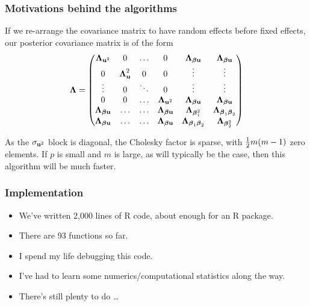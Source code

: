 \documentclass{beamer}
\begin{document}
\begin{frame}
\frametitle{Motivations behind the algorithms}
If we re-arrange the covariance matrix to have random effects before
fixed effects, our posterior covariance matrix is of the form
\begin{align*} {\boldsymbol\Lambda} =
\begin{pmatrix}
{\boldsymbol\Lambda}_{{\bf u}^2} & 0 & \ldots & 0 & {\boldsymbol \Lambda}_{{\boldsymbol \beta} {\bf u}} & {\boldsymbol \Lambda}_{{\boldsymbol \beta} {\bf u}} \\
0 & {\boldsymbol \Lambda}_{{\bf u}}^2 & 0 & 0 & \vdots & \vdots \\
\vdots & 0 & \ddots & 0 & \vdots & \vdots \\
0 & 0 & \ldots & {\boldsymbol \Lambda}_{{\bf u}^2} & {\boldsymbol \Lambda}_{{\boldsymbol \beta} {\bf u}} & {\boldsymbol \Lambda}_{{\boldsymbol \beta} {\bf u}} \\
{\boldsymbol \Lambda}_{{\boldsymbol \beta} {\bf u}} & \ldots & \ldots & {\boldsymbol \Lambda}_{{\boldsymbol \beta} {\bf u}} & {\boldsymbol \Lambda}_{{\boldsymbol \beta}_1^2} & {\boldsymbol \Lambda}_{{\boldsymbol \beta}_1 {\boldsymbol \beta}_2} \\
{\boldsymbol \Lambda}_{{\boldsymbol \beta} {\bf u}} & \ldots & \ldots &{\boldsymbol \Lambda}_{{\boldsymbol \beta} {\bf u}}  & {\boldsymbol \Lambda}_{{\boldsymbol \beta}_1 {\boldsymbol \beta}_2} & {\boldsymbol \Lambda}_{{\boldsymbol \beta}_2^2}
\end{pmatrix}
\end{align*}

As the $\sigma_{{\bf u}^2}$ block is diagonal, the Cholesky factor is 
sparse, with $\tfrac{1}{2} m(m-1)$ zero elements. If $p$ is small
and $m$ is large, as will typically be the case, then this algorithm will
be much faster.
\end{frame}

\begin{frame}
\frametitle{Implementation}
\begin{itemize}
\item We've written 2,000 lines of R code, about enough for an R package.
\item There are 93 functions so far.
\item I spend my life debugging this code.
\item I've had to learn some numerics/computational statistics along the
way.
\item There's still plenty to do \ldots
\end{itemize}
\end{frame}
\end{document}
